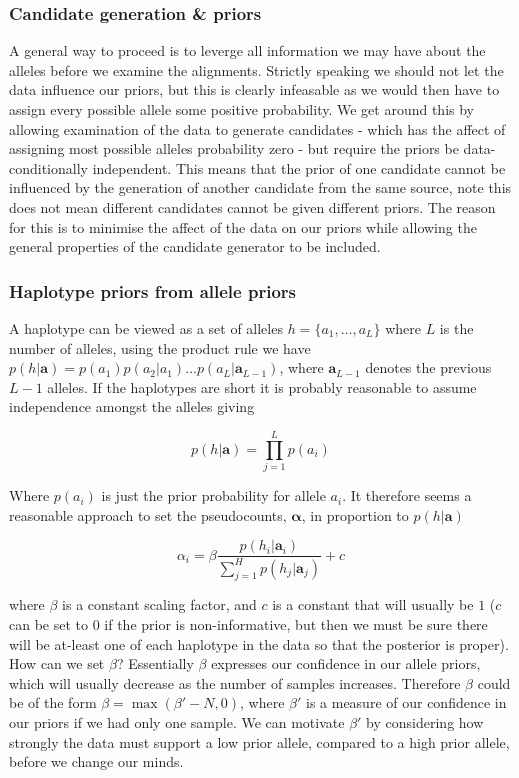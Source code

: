 \documentclass{article}
\begin{document}
\subsubsection{Candidate generation \& priors}

A general way to proceed is to leverge all information we may have about the alleles before we examine the alignments. Strictly speaking we should not let the data influence our priors, but this is clearly infeasable as we would then have to assign every possible allele some positive probability. We get around this by allowing examination of the data to generate candidates - which has the affect of assigning most possible alleles probability zero - but require the priors be data-conditionally independent. This means that the prior of one candidate cannot be influenced by the generation of another candidate from the same source, note this does not mean different candidates cannot be given different priors. The reason for this is to minimise the affect of the data on our priors while allowing the general properties of the candidate generator to be included.

\subsubsection{Haplotype priors from allele priors}

A haplotype can be viewed as a set of alleles $h = \{a_1, \dots, a_L\}$ where $L$ is the number of alleles, using the product rule we have $p(h | \boldsymbol{a}) = p(a_1)p(a_2 | a_1)\dots p(a_L | \boldsymbol{a}_{L-1})$, where $\boldsymbol{a}_{L-1}$ denotes the previous $L-1$ alleles. If the haplotypes are short it is probably reasonable to assume independence amongst the alleles giving

\begin{equation}
    p(h | \boldsymbol{a}) = \prod_{j = 1}^L p(a_i)
\end{equation}

Where $p(a_i)$ is just the prior probability for allele $a_i$. It therefore seems a reasonable approach to set the pseudocounts, $\boldsymbol{\alpha}$, in proportion to $p(h | \boldsymbol{a})$

\begin{equation}
    \alpha_i = \beta \frac{p(h_i | \boldsymbol{a}_i)}{\sum_{j = 1}^H p(h_j | \boldsymbol{a}_j)} + c
\end{equation}

where $\beta$ is a constant scaling factor, and $c$ is a constant that will usually be $1$ ($c$ can be set to $0$ if the prior is non-informative, but then we must be sure there will be at-least one of each haplotype in the data so that the posterior is proper). How can we set $\beta$? Essentially $\beta$ expresses our confidence in our allele priors, which will usually decrease as the number of samples increases. Therefore $\beta$ could be of the form $\beta = \max(\beta' - N, 0)$, where $\beta'$ is a measure of our confidence in our priors if we had only one sample. We can motivate $\beta'$ by considering how strongly the data must support a low prior allele, compared to a high prior allele, before we change our minds.
\end{document}
